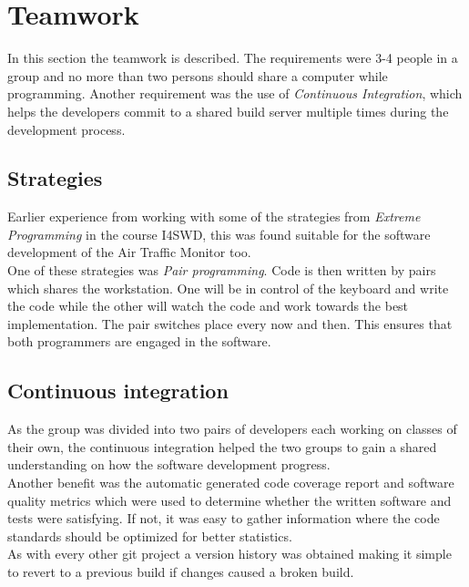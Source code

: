 \section{Teamwork}
In this section the teamwork is described. The requirements were 3-4 people in a group and no more than two persons should share a computer while programming. Another requirement was the use of \emph{Continuous Integration}, which helps the developers commit to a shared build server multiple times during the development process.

\subsection{Strategies}
Earlier experience from working with some of the strategies from \emph{Extreme Programming} in the course I4SWD, this was found suitable for the software development of the Air Traffic Monitor too. \\
One of these strategies was \emph{Pair programming}. Code is then written by pairs which shares the workstation. One will be in control of the keyboard and write the code while the other will watch the code and work towards the best implementation. The pair switches place every now and then. This ensures that both programmers are engaged in the software.

\subsection{Continuous integration}
As the group was divided into two pairs of developers each working on classes of their own, the continuous integration helped the two groups to gain a shared understanding on how the software development progress.\\ 
Another benefit was the automatic generated code coverage report and software quality metrics which were used to determine whether the written software and tests were satisfying. If not, it was easy to gather information where the code standards should be optimized for better statistics.\\ 
As with every other git project a version history was obtained making it simple to revert to a previous build if changes caused a broken build.\\